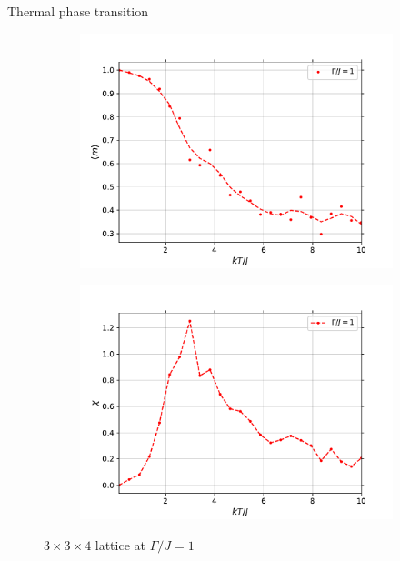 \documentclass[aspectratio=169, xcolor=dvipsnames]{beamer}
\begin{document}
\begin{frame}{Thermal phase transition}
	
	\begin{figure}
		\centering
		\begin{subfigure}{0.45\textwidth}
			\centering
			\label{fig:T_m}
			\includegraphics[width=\textwidth]{Plots/T_transition_m.pdf}
		\end{subfigure}
		\begin{subfigure}{0.45\textwidth}
			\centering
			\label{fig:T_chi}
			\includegraphics[width=\textwidth]{Plots/T_transition_chi.pdf}
		\end{subfigure}
		\caption{$3\times3\times4$ lattice at $\Gamma/J=1$}
		\label{fig:T_transition}
	\end{figure}
	
\end{frame}
\end{document}
